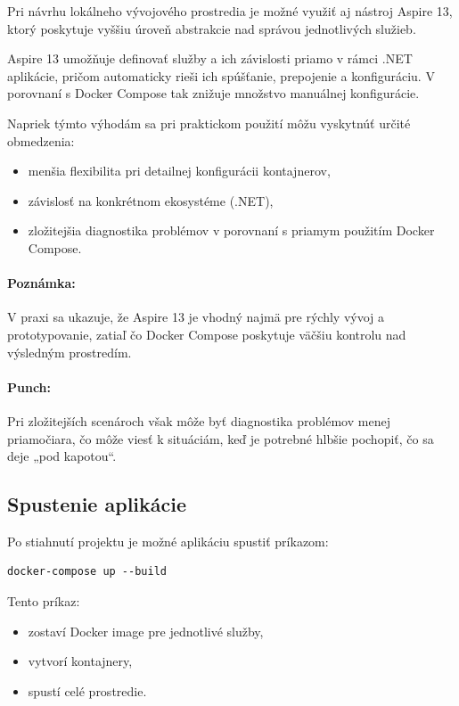 Pri návrhu lokálneho vývojového prostredia je možné využiť aj nástroj Aspire 13, 
ktorý poskytuje vyššiu úroveň abstrakcie nad správou jednotlivých služieb.

Aspire 13 umožňuje definovať služby a ich závislosti priamo v rámci .NET aplikácie, 
pričom automaticky rieši ich spúšťanie, prepojenie a konfiguráciu. 
V porovnaní s Docker Compose tak znižuje množstvo manuálnej konfigurácie.

Napriek týmto výhodám sa pri praktickom použití môžu vyskytnúť určité obmedzenia:
\begin{itemize}
    \item menšia flexibilita pri detailnej konfigurácii kontajnerov,
    \item závislosť na konkrétnom ekosystéme (.NET),
    \item zložitejšia diagnostika problémov v porovnaní s priamym použitím Docker Compose.
\end{itemize}

\paragraph{Poznámka:}
V praxi sa ukazuje, že Aspire 13 je vhodný najmä pre rýchly vývoj a prototypovanie, 
zatiaľ čo Docker Compose poskytuje väčšiu kontrolu nad výsledným prostredím.

\paragraph{Punch:}
Pri zložitejších scenároch však môže byť diagnostika problémov menej priamočiara, 
čo môže viesť k situáciám, keď je potrebné hlbšie pochopiť, čo sa deje „pod kapotou“.

\subsection{Spustenie aplikácie}

Po stiahnutí projektu je možné aplikáciu spustiť príkazom:

\begin{verbatim}
docker-compose up --build
\end{verbatim}

Tento príkaz:
\begin{itemize}
    \item zostaví Docker image pre jednotlivé služby,
    \item vytvorí kontajnery,
    \item spustí celé prostredie.
\end{itemize}

